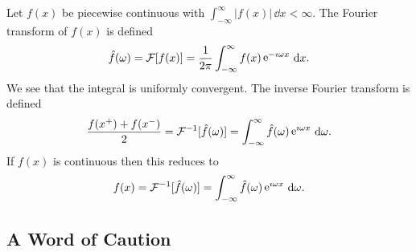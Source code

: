 \begin{Result}
  Let $f(x)$ be piecewise continuous with $\int_{-\infty}^\infty |f(x)|\,\dd x < \infty$. 
  The Fourier transform of $f(x)$ is defined
  \[ 
  \hat{f}(\omega) = \mathcal{F}[f(x)] = \frac{1}{2\pi} \int_{-\infty}^\infty f(x) \mathop{\mathrm{e}}\nolimits^{-\imath \omega x}\,\mathrm{d} x.
  \]
  We see that the integral is uniformly convergent.
  The inverse Fourier transform is defined
  \[ 
  \frac{f(x^+) + f(x^-)}{2} = \mathcal{F}^{-1}[\hat{f}(\omega)]
  = \int_{-\infty}^\infty \hat{f}(\omega) \mathop{\mathrm{e}}\nolimits^{\imath \omega x} \,\mathrm{d} \omega.
  \]
  If $f(x)$ is continuous then this reduces to
  \[ 
  f(x) = \mathcal{F}^{-1}[\hat{f}(\omega)] = \int_{-\infty}^\infty \hat{f}(\omega) \mathop{\mathrm{e}}\nolimits^{\imath \omega x}\,\mathrm{d} \omega.
  \]
\end{Result}








\subsection{A Word of Caution}




